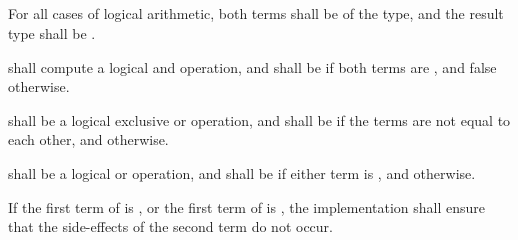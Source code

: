 \begin{grammar}
 \\
	 \\
	 \terminal{\&\&}  \\

 \\
	 \\
	 \terminal{\textasciicircum\textasciicircum}  \\

 \\
	 \\
	 \terminal{||}  \\
\end{grammar}

\specsubsubitem
For all cases of logical arithmetic, both terms shall be of the 
type, and the result type shall be .

\specsubsubitem
\terminal{\&\&} shall compute a logical and operation, and shall be
 if both terms are , and false otherwise.

\specsubsubitem
\terminal{\textasciicircum\textasciicircum} shall be a logical exclusive or
operation, and shall be  if the terms are not equal to each
other, and  otherwise.

\specsubsubitem
\terminal{||} shall be a logical or operation, and shall be  if
either term is , and  otherwise.

\specsubsubitem
If the first term of  is ,
or the first term of  is ,
the implementation shall ensure that the side-effects of the second term do not
occur.


\begin{grammar}
 \\
	  \\
	    \\
	    \\

 \\
	\terminal{(}  \terminal{)}  \\
\end{grammar}

